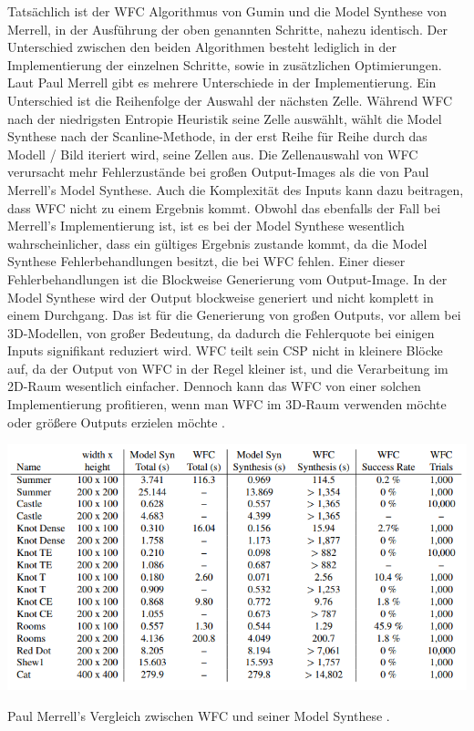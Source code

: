 \documentclass[12pt, a4paper,twoside,openright]{report} %
\begin{document}
Tatsächlich ist der WFC Algorithmus von Gumin und die Model Synthese von Merrell, in der Ausführung der oben genannten Schritte, nahezu identisch.
Der Unterschied zwischen den beiden Algorithmen besteht lediglich in der Implementierung der einzelnen Schritte, sowie in zusätzlichen Optimierungen.
Laut Paul Merrell gibt es mehrere Unterschiede in der Implementierung.
Ein Unterschied ist die Reihenfolge der Auswahl der nächsten Zelle.
Während WFC nach der niedrigsten Entropie Heuristik seine Zelle auswählt,
wählt die Model Synthese nach der Scanline-Methode, in der erst Reihe für Reihe durch das Modell / Bild iteriert wird, seine Zellen aus.
Die Zellenauswahl von WFC verursacht mehr Fehlerzustände bei großen Output-Images als die von Paul Merrell's Model Synthese.
Auch die Komplexität des Inputs kann dazu beitragen, dass WFC nicht zu einem Ergebnis kommt.
Obwohl das ebenfalls der Fall bei Merrell's Implementierung ist, ist es bei der Model Synthese wesentlich wahrscheinlicher, dass ein gültiges Ergebnis zustande kommt,
da die Model Synthese Fehlerbehandlungen besitzt, die bei WFC fehlen.
\newline
Einer dieser Fehlerbehandlungen ist die Blockweise Generierung vom Output-Image.
In der Model Synthese wird der Output blockweise generiert und nicht komplett in einem Durchgang.
Das ist für die Generierung von großen Outputs, vor allem bei 3D-Modellen, von großer Bedeutung, da dadurch die Fehlerquote bei einigen Inputs signifikant reduziert wird.
WFC teilt sein CSP nicht in kleinere Blöcke auf, da der Output von WFC in der Regel kleiner ist, und die Verarbeitung im 2D-Raum wesentlich einfacher.
Dennoch kann das WFC von einer solchen Implementierung profitieren, wenn man WFC im 3D-Raum verwenden möchte oder größere Outputs erzielen möchte \cite{merrell2018compare}.

\begin{table}[H]
    \centering
    \includegraphics[width=1\linewidth]{images/timing-and-success-comparison.png}%
    \caption{Paul Merrell's Vergleich zwischen WFC und seiner Model Synthese \cite{merrell2018compare}.}%
\end{table}
\end{document}

